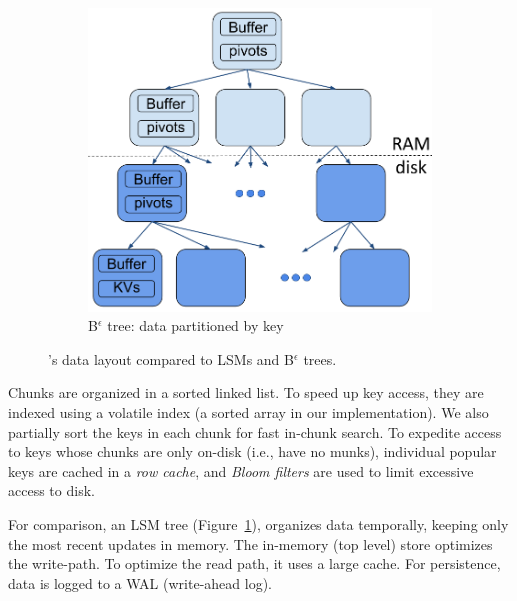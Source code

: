 {\begin{figure}[tb]
\begin{subfigure}{0.3\linewidth}
\label{fig:lsm}
\end{subfigure}
\hspace{1mm}
\begin{subfigure}{0.3\linewidth}
\includegraphics[width=\textwidth]{Bepsilon.png}
\caption{B$^\epsilon$  tree: data partitioned by key}
\label{fig:bepsilon}
\end{subfigure}
\caption{\sys's data layout compared to LSMs and B$^\epsilon$ trees.}
\label{fig:layout}
\end{figure}
}

Chunks are organized in a sorted linked list. To speed up key access, they are 
indexed using a volatile index (a sorted array in our implementation).  
We also partially sort the keys in each chunk for fast in-chunk search.  
 To expedite access to  keys whose chunks are only on-disk  (i.e., have no munks), 
individual popular keys are cached in a \emph{row cache}, 
and \emph{Bloom filters} are used to limit excessive access to disk. 

For comparison, an LSM tree (Figure~\ref{fig:lsm}), organizes data temporally, keeping only the most recent updates in memory.
The in-memory (top level) store optimizes the write-path. To optimize the read path, it uses a large cache.   
For persistence, data is logged to a WAL (write-ahead log). 

